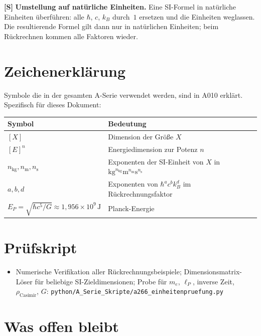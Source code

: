 \textbf{[S]} \textbf{Umstellung auf natürliche Einheiten.} Eine SI-Formel in
natürliche Einheiten überführen: alle $\hbar$, $c$, $k_B$ durch~$1$ ersetzen
und die Einheiten weglassen. Die resultierende Formel gilt dann nur in natürlichen
Einheiten; beim Rückrechnen kommen alle Faktoren wieder.

\section{Zeichenerklärung}

Symbole die in der gesamten A-Serie verwendet werden, sind in A010 erklärt.
Spezifisch für dieses Dokument:

\begin{center}
\renewcommand{\arraystretch}{1.3}
{\small\begin{tabular}{lp{9cm}}
\toprule
Symbol & Bedeutung \\
\midrule
$[X]$ & Dimension der Größe $X$ \\
$[E]^n$ & Energiedimension zur Potenz $n$ \\
$n_\text{kg},n_\text{m},n_\text{s}$ & Exponenten der SI-Einheit von $X$
  in $\text{kg}^{n_\text{kg}}\text{m}^{n_\text{m}}\text{s}^{n_\text{s}}$ \\
$a,b,d$ & Exponenten von $\hbar^a c^b k_B^d$ im Rückrechnungsfaktor \\
$E_P = \sqrt{\hbar c^5/G}\approx1{,}956\times10^9\,\text{J}$ & Planck-Energie \\
\bottomrule
\end{tabular}}
\renewcommand{\arraystretch}{1.0}
\end{center}

\section{Prüfskript}

\begin{itemize}[leftmargin=2em,itemsep=2pt,topsep=2pt]
  \item Numerische Verifikation aller Rückrechnungsbeispiele;
    Dimensionsmatrix-Löser für beliebige SI-Zieldimensionen;
    Probe für $m_e$, $\ell_P$, inverse Zeit, $\rho_\text{Casimir}$, $G$:
    \texttt{python/A\_Serie\_Skripte/a266\_einheitenpruefung.py}
\end{itemize}

\section{Was offen bleibt}

